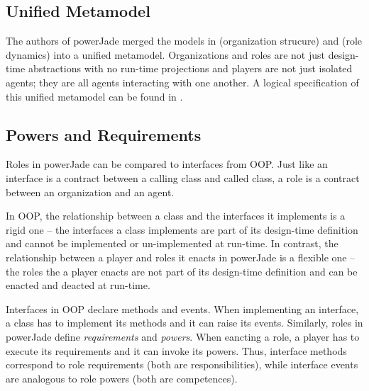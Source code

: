 \subsection*{Unified Metamodel}

The authors of powerJade merged the models in \cite{Boella04} (organization strucure) and \cite{Boella04} (role dynamics) into a unified metamodel.
Organizations and roles are not just design-time abstractions with no run-time projections and players are not just isolated agents; they are all agents interacting with one another.
A logical specification of this unified metamodel can be found in \cite{Boella07}.

\subsection*{Powers and Requirements}

Roles in powerJade can be compared to interfaces from OOP.
Just like an interface is a contract between a calling class and called class, a role is a contract between an organization and an agent.

In OOP, the relationship between a class and the interfaces it implements is a rigid one -- the interfaces a class implements are part of its design-time definition and cannot be implemented or un-implemented at run-time.
In contrast, the relationship between a player and roles it enacts in powerJade is a flexible one -- the roles the a player enacts are not part of its design-time definition and can be enacted and deacted at run-time.

Interfaces in OOP declare methods and events.
When implementing an interface, a class has to implement its methods and it can raise its events.
Similarly, roles in powerJade define \textit{requirements} and \textit{powers}.
When eancting a role, a player has to execute its requirements and it can invoke its powers.
Thus, interface methods correspond to role requirements (both are responsibilities), while interface events are analogous to role powers (both are competences).